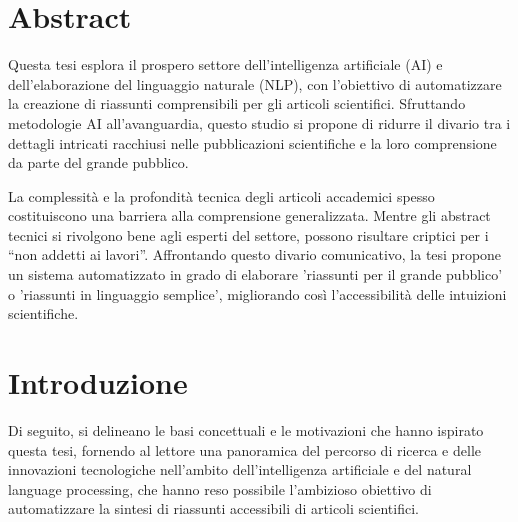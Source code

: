 \documentclass[12pt,a4paper,twoside,openright]{book}
\begin{document}
\frontmatter 

\maketitle

\chapter*{Abstract}

Questa tesi esplora il prospero settore dell'intelligenza artificiale (AI) e dell'elaborazione del linguaggio naturale (NLP), con l'obiettivo di automatizzare la creazione di riassunti comprensibili per gli articoli scientifici. Sfruttando metodologie AI all'avanguardia, questo studio si propone di ridurre il divario tra i dettagli intricati racchiusi nelle pubblicazioni scientifiche e la loro comprensione da parte del grande pubblico.

La complessità e la profondità tecnica degli articoli accademici spesso costituiscono una barriera alla comprensione generalizzata. Mentre gli abstract tecnici si rivolgono bene agli esperti del settore, possono risultare criptici per i ``non addetti ai lavori''. Affrontando questo divario comunicativo, la tesi propone un sistema automatizzato in grado di elaborare 'riassunti per il grande pubblico' o 'riassunti in linguaggio semplice', migliorando così l'accessibilità delle intuizioni scientifiche.

\newpage

\tableofcontents

\newpage

\listoffigures

\mainmatter

\pagestyle{fancy} 
\fancyhead[LO]{\nouppercase{\rightmark}}
\fancyhead[RE]{\nouppercase{\leftmark}}
\fancyhead[LE,RO]{\thepage}
\fancyfoot{}


\chapter{Introduzione}\label{cap:intro}

Di seguito, si delineano le basi concettuali e le motivazioni che hanno ispirato questa tesi, fornendo al lettore una panoramica del percorso di ricerca e delle innovazioni tecnologiche nell'ambito dell'intelligenza artificiale e del natural language processing, che hanno reso possibile l'ambizioso obiettivo di automatizzare la sintesi di riassunti accessibili di articoli scientifici.
\end{document}
